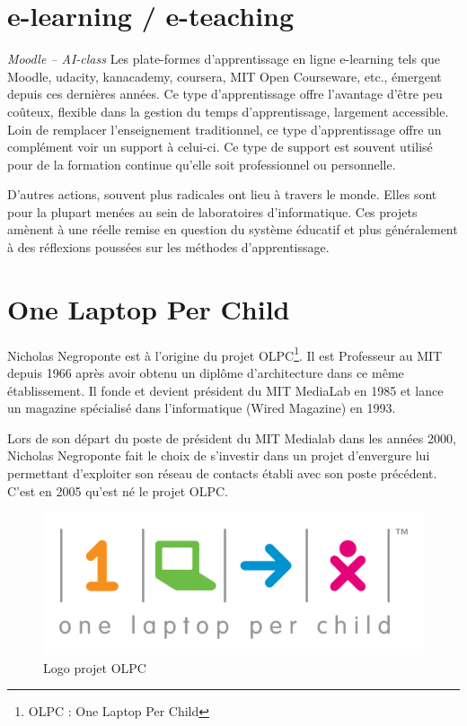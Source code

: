 \section{e-learning / e-teaching}
\textit{Moodle -- AI-class}
Les plate-formes d'apprentissage en ligne \og{}e-learning\fg{} tels
que Moodle, udacity, kanacademy, coursera, MIT Open Courseware, etc.,
émergent depuis ces dernières années. Ce type d'apprentissage offre l'avantage d'être peu
coûteux, flexible dans la gestion du temps d'apprentissage, largement
accessible. Loin de remplacer l'enseignement traditionnel, ce type
d'apprentissage offre un complément voir un support à celui-ci. Ce
type de support est souvent utilisé pour de la formation continue
qu'elle soit professionnel ou personnelle.

D'autres actions, souvent plus radicales ont lieu à travers le monde. Elles sont pour la plupart menées au sein de laboratoires d'informatique. Ces projets amènent à une réelle remise en question du système éducatif et plus généralement à des réflexions poussées sur les méthodes d'apprentissage.

\section{One Laptop Per Child}

Nicholas Negroponte est à l'origine du projet OLPC\footnote{OLPC : One Laptop Per Child}. Il est Professeur au MIT depuis 1966 après avoir obtenu un diplôme d'architecture dans ce même établissement. Il fonde et devient président du MIT MediaLab en 1985 et lance un magazine spécialisé dans l'informatique (Wired Magazine) en 1993.

Lors de son départ du poste de président du MIT Medialab dans les années 2000, Nicholas Negroponte fait le choix de s'investir dans un projet d'envergure lui permettant d'exploiter son réseau de contacts établi avec son poste précédent. C'est en 2005 qu'est né le projet OLPC.

\begin{figure}[H]
  \centering
  \includegraphics[width=.5\textwidth]{../resources/illustrations/OLPC_logo}
  \caption{Logo projet OLPC}
\end{figure}

